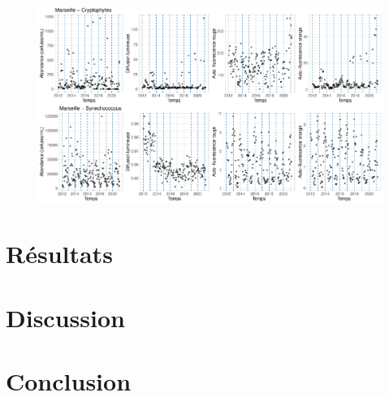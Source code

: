 \documentclass[12pt]{article}
\begin{document}
\begin{figure}
\centering
\includegraphics[width=\textwidth]{fig/visualisation_cyano.pdf}
\caption{}
\end{figure}




\section{Résultats}



\section{Discussion}



\section{Conclusion}




\newpage
{}
\listoffigures

\listoftables

\newpage
\begin{appendices}

\end{appendices}


\begin{abstract}

\end{abstract}
\end{document}

